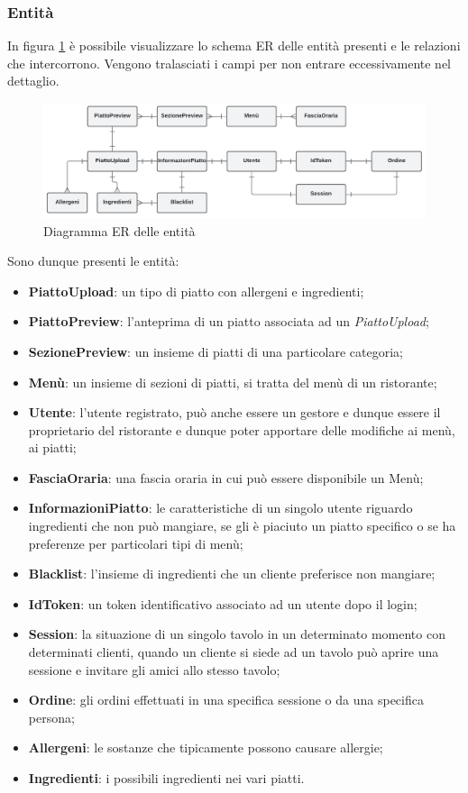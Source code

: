 \subsubsection{Entità}
In figura \ref{ER-sushilab} è possibile visualizzare lo schema ER delle entità presenti e le relazioni che intercorrono. Vengono tralasciati i campi per non entrare eccessivamente nel dettaglio.
\FloatBarrier
\begin{figure}[!ht]
\centering
\includegraphics[width=1\linewidth]{immagini/ER_sushilab.pdf}
\caption{Diagramma ER delle entità}
\label{ER-sushilab}
\end{figure}
\FloatBarrier
Sono dunque presenti le entità:
\begin{itemize}
  \item \textbf{PiattoUpload}: un tipo di piatto con allergeni e ingredienti;
  \item \textbf{PiattoPreview}: l'anteprima di un piatto associata ad un \textit{PiattoUpload};
  \item \textbf{SezionePreview}: un insieme di piatti di una particolare categoria;
  \item \textbf{Menù}: un insieme di sezioni di piatti, si tratta del menù di un ristorante;
  \item \textbf{Utente}: l'utente registrato, può anche essere un gestore e dunque essere il proprietario del ristorante e dunque poter apportare delle modifiche ai menù, ai piatti;
  \item \textbf{FasciaOraria}: una fascia oraria in cui può essere disponibile un Menù;
  \item \textbf{InformazioniPiatto}: le caratteristiche di un singolo utente riguardo ingredienti che non può mangiare, se gli è piaciuto un piatto specifico o se ha preferenze per particolari tipi di menù;
  \item \textbf{Blacklist}: l'insieme di ingredienti che un cliente preferisce non mangiare;
  \item \textbf{IdToken}: un token identificativo associato ad un utente dopo il login;
  \item \textbf{Session}: la situazione di un singolo tavolo in un determinato momento con determinati clienti, quando un cliente si siede ad un tavolo può aprire una sessione e invitare gli amici allo stesso tavolo;
  \item \textbf{Ordine}: gli ordini effettuati in una specifica sessione o da una specifica persona;
  \item \textbf{Allergeni}: le sostanze che tipicamente possono causare allergie;
  \item \textbf{Ingredienti}: i possibili ingredienti nei vari piatti.
\end{itemize}
